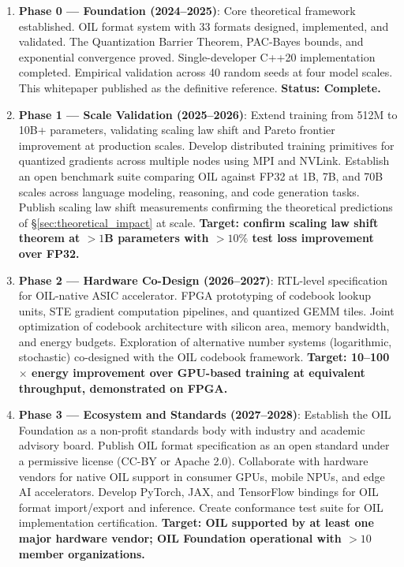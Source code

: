 \begin{enumerate}

    \item \textbf{Phase 0 --- Foundation (2024--2025)}: Core theoretical framework established. OIL format system with 33 formats designed, implemented, and validated. The Quantization Barrier Theorem, PAC-Bayes bounds, and exponential convergence proved. Single-developer C++20 implementation completed. Empirical validation across 40 random seeds at four model scales. This whitepaper published as the definitive reference. \textbf{Status: Complete.}

    \item \textbf{Phase 1 --- Scale Validation (2025--2026)}: Extend \OIL{} training from 512M to 10B+ parameters, validating scaling law shift and Pareto frontier improvement at production scales. Develop distributed training primitives for quantized gradients across multiple nodes using MPI and NVLink. Establish an open benchmark suite comparing OIL against FP32 at 1B, 7B, and 70B scales across language modeling, reasoning, and code generation tasks. Publish scaling law shift measurements confirming the theoretical predictions of \S\ref{sec:theoretical_impact} at scale. \textbf{Target: confirm scaling law shift theorem at $> 1$B parameters with $> 10\%$ test loss improvement over FP32.}

    \item \textbf{Phase 2 --- Hardware Co-Design (2026--2027)}: RTL-level specification for OIL-native ASIC accelerator. FPGA prototyping of codebook lookup units, STE gradient computation pipelines, and quantized GEMM tiles. Joint optimization of codebook architecture with silicon area, memory bandwidth, and energy budgets. Exploration of alternative number systems (logarithmic, stochastic) co-designed with the OIL codebook framework. \textbf{Target: 10--100$\times$ energy improvement over GPU-based \OIL{} training at equivalent throughput, demonstrated on FPGA.}

    \item \textbf{Phase 3 --- Ecosystem and Standards (2027--2028)}: Establish the OIL Foundation as a non-profit standards body with industry and academic advisory board. Publish OIL format specification as an open standard under a permissive license (CC-BY or Apache 2.0). Collaborate with hardware vendors for native OIL support in consumer GPUs, mobile NPUs, and edge AI accelerators. Develop PyTorch, JAX, and TensorFlow bindings for OIL format import/export and inference. Create conformance test suite for OIL implementation certification. \textbf{Target: OIL supported by at least one major hardware vendor; OIL Foundation operational with $> 10$ member organizations.}


\end{enumerate}
